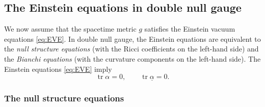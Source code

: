 \documentclass[10pt]{article}
\numberwithin{equation}{section}
\theoremstyle{plain}
\theoremstyle{definition}
\newcommand{\tr}{\operatorname{tr}}
\begin{document}
\begin{appendix}
\subsection{The Einstein equations in double null gauge}

We now assume that the spacetime metric $g$ satisfies the Einstein vacuum equations \eqref{eq:EVE}. In double null gauge, the Einstein equations are equivalent to the \emph{null structure equations} (with the Ricci coefficients on the left-hand side) and the \emph{Bianchi equations} (with the curvature components on the left-hand side). The Einstein equations \eqref{eq:EVE} imply 
\begin{equation}
    \tr\alpha=0,\qquad \tr\underline\alpha=0. \label{eq:alpha-traceless}
\end{equation}

\subsubsection{The null structure equations}


\end{appendix}
\end{document}
